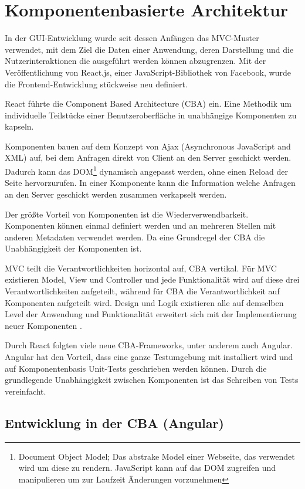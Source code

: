 \chapter{Komponentenbasierte Architektur}

In der GUI-Entwicklung wurde seit dessen Anfängen das MVC-Muster verwendet, mit dem Ziel die Daten einer Anwendung, deren Darstellung und die Nutzerinteraktionen die ausgeführt werden können abzugrenzen. Mit der Veröffentlichung von React.js, einer JavaScript-Bibliothek von Facebook, wurde die Frontend-Entwicklung stückweise neu definiert. 

React führte die \glqq Component Based Architecture\grqq{} (CBA) ein. Eine Methodik um individuelle Teilstücke einer Benutzeroberfläche in unabhängige Komponenten zu kapseln. 

Komponenten bauen auf dem Konzept von Ajax (Asynchronous JavaScript and XML) auf, bei dem Anfragen direkt von Client an den Server geschickt werden. Dadurch kann das DOM\footnote{Document Object Model; Das abstrake Model einer Webseite, das verwendet wird um diese zu rendern. JavaScript kann auf das DOM zugreifen und manipulieren um zur Laufzeit Änderungen vorzunehmen} dynamisch angepasst werden, ohne einen Reload der Seite hervorzurufen. In einer Komponente kann die Information welche Anfragen an den Server geschickt werden zusammen verkapselt werden. 

Der größte Vorteil von Komponenten ist die Wiederverwendbarkeit. Komponenten können einmal definiert werden und an mehreren Stellen mit anderen Metadaten verwendet werden. Da eine Grundregel der CBA die Unabhängigkeit der Komponenten ist. 

MVC teilt die Verantwortlichkeiten horizontal auf, CBA vertikal. Für MVC existieren Model, View und Controller und jede Funktionalität wird auf diese drei Verantwortlichkeiten aufgeteilt, während für CBA die Verantwortlichkeit auf Komponenten aufgeteilt wird. Design und Logik existieren alle auf demselben Level der Anwendung und Funktionalität erweitert sich mit der Implementierung neuer Komponenten \cite{dshaps.16.06.2016}.  

Durch React folgten viele neue CBA-Frameworks, unter anderem auch Angular. Angular hat den Vorteil, dass eine ganze Testumgebung mit installiert wird und auf Komponentenbasis Unit-Tests geschrieben werden können. Durch die grundlegende Unabhängigkeit zwischen Komponenten ist das Schreiben von Tests vereinfacht. 

\section{Entwicklung in der CBA (Angular)}

